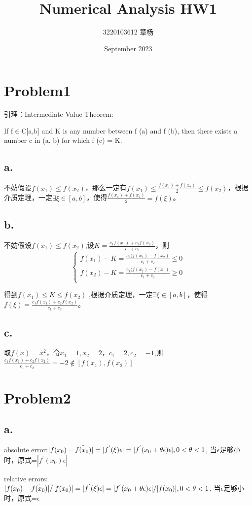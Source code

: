 \documentclass{article}
\title{Numerical Analysis HW1}
\author{3220103612 章杨}
\date{September 2023}
\begin{document}
\maketitle
\large
\section{Problem1}
引理：Intermediate Value Theorem:

If f$\in$C[a,b] and K is any number between f (a) and f (b), then there exists a number c in (a, b) for which f (c) = K.
\subsection{a.}
不妨假设$f(x_1) \leq f(x_2)$，那么一定有$f(x_1) \leq \frac{f(x_1)+f(x_2)}{2} \leq f(x_2)$，根据介质定理，一定$\exists \xi \in [a,b]$，使得$\frac{f(x_1)+f(x_2)}{2}=f(\xi)$。
\subsection{b.}
不妨假设$f(x_1) \leq f(x_2)$,设$K=\frac{c_1 f(x_1)+c_2 f(x_2)}{c_1+c_2}$，则
    $$\begin{cases}
    f(x_1)-K=\frac{c_2(f(x_1)-f(x_2)}{c_1+c_2}\leq 0\\
    f(x_2)-K=\frac{c_1(f(x_2)-f(x_1)}{c_1+c_2}\geq 0\\
    \end{cases}
    $$
    
得到$f(x_1)\leq K \leq f(x_2)$ ,根据介质定理，一定$\exists \xi \in [a,b]$，使得$f(\xi)=\frac{c_1 f(x_1)+c_2 f(x_2)}{c_1+c_2}$。

\subsection{c.}
取$f(x)=x^2$，令$x_1=1,x_2=2，c_1=2,c_2=-1$,则$\frac{c_1 f(x_1)+c_2 f(x_2)}{c_1+c_2}=-2\notin [f(x_1),f(x_2)]$
\section{Problem2}
\subsection{a.}
absolute error:$|f(x_0)-\Tilde{f(x_0)}|=|f^{'}(\xi) \epsilon|=|f^{'}(x_0+\theta \epsilon) \epsilon|,0<\theta<1$,
当$\epsilon$足够小时，原式=$|f^{'}(x_0) \epsilon|$

relative errors:$|f(x_0)-\Tilde{f(x_0)}|/|f(x_0)|=|f^{'}(\xi) \epsilon|=|f^{'}(x_0+\theta \epsilon) \epsilon|/|f(x_0)|,0<\theta<1$,
当$\epsilon$足够小时，原式=$\epsilon$
\end{document}
